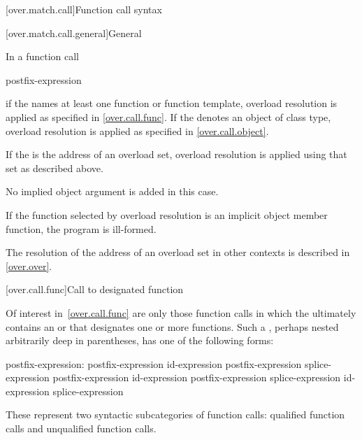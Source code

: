[over.match.call]{Function call syntax}%

[over.match.call.general]{General}%

\pnum
In a function call
\begin{ncsimplebnf}
postfix-expression \terminal{(}  \terminal{)}
\end{ncsimplebnf}
if the  names at least one function or
function template,
overload resolution is applied as specified in \ref{over.call.func}.
If the  denotes an object of class type, overload
resolution is applied as specified in \ref{over.call.object}.

\pnum
If the  is the address of an overload set,
overload resolution is applied using that set as described above.
\begin{note}
No implied object argument is added in this case.
\end{note}
If the function selected by overload resolution is
an implicit object member function,
the program is ill-formed.
\begin{note}
The resolution of the address of an
overload set in other contexts is described in \ref{over.over}.
\end{note}

[over.call.func]{Call to designated function}

\pnum
Of interest in~\ref{over.call.func} are only those function calls
in which the  ultimately contains
an  or 
that designates one or more functions.
Such a
,
perhaps nested arbitrarily deep in
parentheses, has one of the following forms:

\begin{ncbnf}
postfix-expression:\br
    postfix-expression  id-expression\br
    postfix-expression  splice-expression\br
    postfix-expression \terminal{->} id-expression\br
    postfix-expression \terminal{->} splice-expression\br
    id-expression\br
    splice-expression
\end{ncbnf}

These represent two syntactic subcategories of function calls:
qualified function calls and unqualified function calls.

